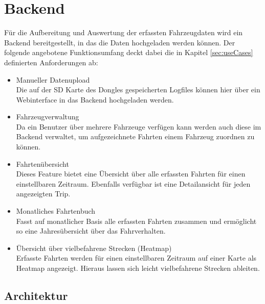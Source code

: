 
\section{Backend}

Für die Aufbereitung und Auswertung der erfassten Fahrzeugdaten wird ein Backend bereitgestellt, in das die Daten hochgeladen werden können. Der folgende angebotene Funktionsumfang deckt dabei die in Kapitel \ref{sec:useCases} definierten Anforderungen ab:

\begin{itemize}
\item Manueller Datenupload \\
Die auf der SD Karte des Dongles gespeicherten Logfiles können hier über ein Webinterface in das Backend hochgeladen werden.
\item Fahrzeugverwaltung \\
Da ein Benutzer über mehrere Fahrzeuge verfügen kann werden auch diese im Backend verwaltet, um aufgezeichnete Fahrten einem Fahrzeug zuordnen zu können.
\item Fahrtenübersicht \\
Dieses Feature bietet eine Übersicht über alle erfassten Fahrten für einen einstellbaren Zeitraum. Ebenfalls verfügbar ist eine Detailansicht für jeden angezeigten Trip.
\item Monatliches Fahrtenbuch \\
Fasst auf monatlicher Basis alle erfassten Fahrten zusammen und ermöglicht so eine Jahresübersicht über das Fahrverhalten.
\item Übersicht über vielbefahrene Strecken (Heatmap) \\
Erfasste Fahrten werden für einen einstellbaren Zeitraum auf einer Karte als Heatmap angezeigt. Hieraus lassen sich leicht vielbefahrene Strecken ableiten.
\end{itemize}

\subsection{Architektur}
\label{sec:backendArchitecture}


